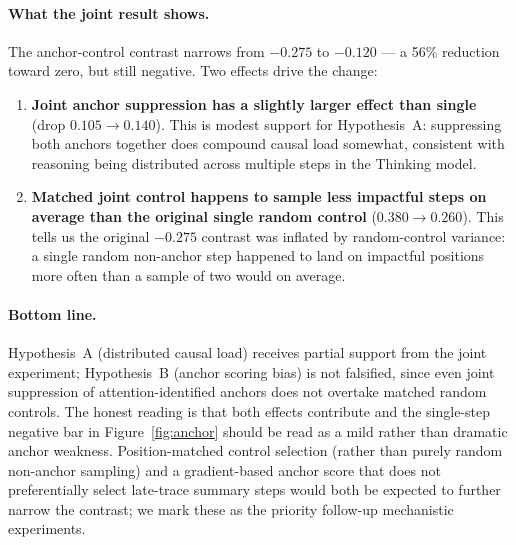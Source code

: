\documentclass{article}
\theoremstyle{plain}
\theoremstyle{definition}
\theoremstyle{remark}
\begin{document}
\paragraph{What the joint result shows.} The anchor-control contrast
narrows from $-0.275$ to $-0.120$ --- a 56\% reduction toward zero,
but still negative. Two effects drive the change:

\begin{enumerate}
\item \textbf{Joint anchor suppression has a slightly larger effect
  than single} (drop $0.105 \to 0.140$). This is modest support for
  Hypothesis~A: suppressing both anchors together does compound
  causal load somewhat, consistent with reasoning being distributed
  across multiple steps in the Thinking model.
\item \textbf{Matched joint control happens to sample less impactful
  steps on average than the original single random control}
  ($0.380 \to 0.260$). This tells us the original $-0.275$ contrast
  was inflated by random-control variance: a single random
  non-anchor step happened to land on impactful positions more often
  than a sample of two would on average.
\end{enumerate}

\paragraph{Bottom line.} Hypothesis~A (distributed causal load)
receives partial support from the joint experiment; Hypothesis~B
(anchor scoring bias) is not falsified, since even joint suppression
of attention-identified anchors does not overtake matched random
controls. The honest reading is that both effects contribute and the
single-step negative bar in Figure~\ref{fig:anchor} should be read as
a mild rather than dramatic anchor weakness. Position-matched control
selection (rather than purely random non-anchor sampling) and a
gradient-based anchor score that does not preferentially select
late-trace summary steps would both be expected to further narrow
the contrast; we mark these as the priority follow-up mechanistic
experiments.
\end{document}
